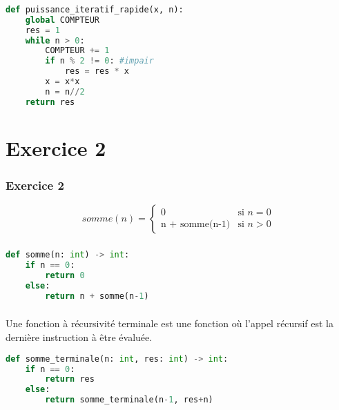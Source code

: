 \documentclass[svgnames,11pt]{beamer}
\begin{document}
\begin{frame}[fragile]
    \frametitle{}

\begin{center}
\begin{lstlisting}[language=Python , basicstyle=\ttfamily\small, xleftmargin=1em, xrightmargin=1em]
def puissance_iteratif_rapide(x, n):
    global COMPTEUR
    res = 1
    while n > 0:
        COMPTEUR += 1
        if n % 2 != 0: #impair
            res = res * x
        x = x*x
        n = n//2
    return res
\end{lstlisting}
\label{CODE}
\end{center}

\end{frame}
\section{Exercice 2}
\begin{frame}
    \frametitle{Exercice 2}
    $$
    somme(n) = \left\{
        \begin{array}{ll}
            0 & \mbox{si  }n=0\\
            \mbox{n + somme(n-1)} & \mbox{si }n>0\
        \end{array}
    \right.
    $$
   

\end{frame}
\begin{frame}[fragile]
    \frametitle{}

\begin{center}
    \begin{lstlisting}[language=Python , basicstyle=\ttfamily\small, xleftmargin=1em, xrightmargin=1em]
def somme(n: int) -> int:
    if n == 0:
        return 0
    else:
        return n + somme(n-1)  
\end{lstlisting}
    \label{CODE}
    \end{center} 

\end{frame}
\begin{frame}[fragile]
    \frametitle{}

\begin{aretenir}
    Une fonction à récursivité terminale est une fonction où l'appel récursif est la dernière instruction à être évaluée.
\end{aretenir}
\begin{center}
\begin{lstlisting}[language=Python , basicstyle=\ttfamily\small, xleftmargin=1em, xrightmargin=1em]
def somme_terminale(n: int, res: int) -> int:
    if n == 0:
        return res
    else:
        return somme_terminale(n-1, res+n)
\end{lstlisting}
\label{CODE}
\end{center}
\end{frame}
\end{document}
